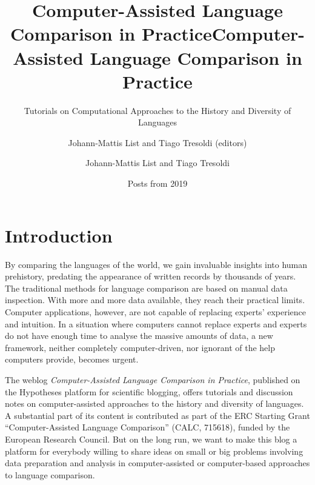 \documentclass[
  a4paper,
  14pt,
  oneside,
  tablecaptionabove
]{scrbook}
\title{Computer-Assisted Language Comparison in Practice}
\subtitle{Tutorials on Computational Approaches to the History and Diversity of
Languages}
\date{Posts from 2019}
\author{Johann-Mattis List and Tiago Tresoldi (editors)}
\title{Computer-Assisted Language Comparison in Practice}
\author{Johann-Mattis List and Tiago Tresoldi}
\begin{document}

\begin{titlepage}
\afterpage{\restorepagecolor}
\newcommand{\colorRule}[3][black]{\textcolor[HTML]{#1}{\rule{#2}{#3}}}
\end{titlepage}
\restoregeometry




{
\setcounter{tocdepth}{3}
\tableofcontents
\newpage
}
\section*{Introduction}
By comparing the languages of the world, we gain invaluable insights
into human prehistory, predating the appearance of written records by
thousands of years. The traditional methods for language comparison are
based on manual data inspection. With more and more data available, they
reach their practical limits. Computer applications, however, are not
capable of replacing experts' experience and intuition. In a situation
where computers cannot replace experts and experts do not have enough
time to analyse the massive amounts of data, a new framework, neither
completely computer-driven, nor ignorant of the help computers provide,
becomes urgent.
  
The weblog \emph{Computer-Assisted Language Comparison in Practice}, published
on the Hypotheses platform for scientific blogging, offers tutorials and
discussion notes on computer-assisted approaches to the history and
diversity of languages. A substantial part of its content is contributed as
part of the ERC Starting Grant ``Computer-Assisted Language Comparison''
(CALC, 715618), funded by the European Research Council. But on the long
run, we want to make this blog a platform for everybody willing to share
ideas on small or big problems involving data preparation and analysis in
computer-assisted or computer-based approaches to language comparison.
 
\end{document}
